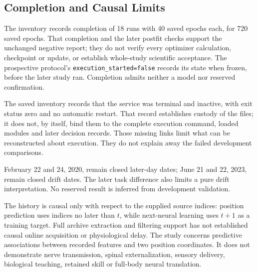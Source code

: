 \subsection{Completion and Causal Limits}

The inventory records completion of 18 runs with 40 saved epochs each, for 720 saved epochs. That completion and the later postfit checks support the unchanged negative report; they do not verify every optimizer calculation, checkpoint or update, or establish whole-study scientific acceptance. The prospective protocol's \texttt{execution\_started=false} records its state when frozen, before the later study ran. Completion admits neither a model nor reserved confirmation.

The saved inventory records that the service was terminal and inactive, with exit status zero and no automatic restart. That record establishes custody of the files; it does not, by itself, bind them to the complete execution command, loaded modules and later decision records. Those missing links limit what can be reconstructed about execution. They do not explain away the failed development comparisons.

February 22 and 24, 2020, remain closed later-day dates; June 21 and 22, 2023,
remain closed drift dates. The later task difference also limits a pure drift
interpretation. No reserved result is inferred from development validation.

The history is causal only with respect to the supplied source indices:
position prediction uses indices no later than $t$, while next-neural learning
uses $t+1$ as a training target. Full archive extraction and filtering support
has not established causal online acquisition or physiological delay. The
study concerns predictive associations between recorded features and two
position coordinates. It does not demonstrate nerve transmission, spinal
externalization, sensory delivery, biological teaching, retained skill or
full-body neural translation.
